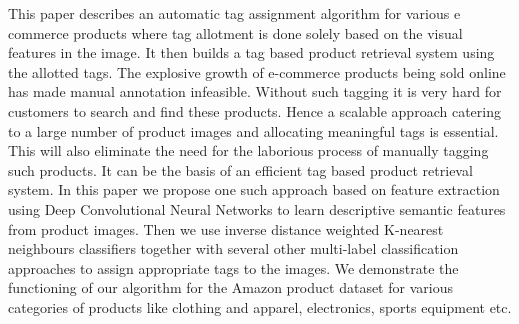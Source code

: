 This paper describes an automatic tag assignment algorithm for various e commerce products where tag allotment is done solely based on the visual features in the image. It then builds a tag based product retrieval system using the allotted tags. The explosive growth of e-commerce products being sold online has made manual annotation infeasible. Without such tagging it is very hard for customers to search and find these products. Hence a scalable approach catering to a large number of product images and allocating meaningful tags is essential. This will also eliminate the need for the laborious process of manually tagging such products. It can be the basis of an efficient tag based product retrieval system. In this paper we propose one such approach based on feature extraction using Deep Convolutional Neural Networks to learn descriptive semantic features from product images. Then we use inverse distance weighted K-nearest neighbours classifiers together with several other multi-label classification approaches to assign appropriate tags to the images. We demonstrate the functioning of our algorithm for the Amazon product dataset for various categories of products like clothing and apparel, electronics, sports equipment etc.
